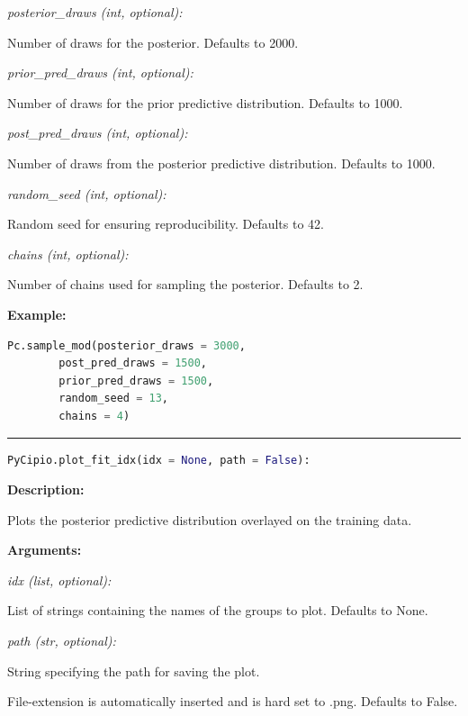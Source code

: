 \documentclass{article}
\begin{document}
\indent \indent \textit{posterior\_draws (int, optional):} 

\indent \indent \indent Number of draws for the posterior. Defaults to 2000.

\indent \indent \textit{prior\_pred\_draws (int, optional):} 

\indent \indent \indent Number of draws for the prior predictive distribution. Defaults to 1000.

\indent \indent \textit{post\_pred\_draws (int, optional):} 

\indent \indent \indent Number of draws from the posterior predictive distribution. Defaults to 1000.

\indent \indent \textit{random\_seed (int, optional):}

\indent \indent \indent Random seed for ensuring reproducibility. Defaults to 42.

\indent \indent \textit{chains (int, optional):} 

\indent \indent \indent Number of chains used for sampling the posterior. Defaults to 2.

\indent \textbf{Example:}

\begin{lstlisting}[language=Python]
        Pc.sample_mod(posterior_draws = 3000, 
        post_pred_draws = 1500, 
        prior_pred_draws = 1500, 
        random_seed = 13, 
        chains = 4)
\end{lstlisting}


\hrule

\begin{lstlisting}[language=Python]
    PyCipio.plot_fit_idx(idx = None, path = False):
\end{lstlisting}

\indent \textbf{Description:} 

\indent \indent Plots the posterior predictive distribution overlayed on the training data.

\indent \textbf{Arguments:}

\indent \indent \textit{idx (list, optional):} 

\indent \indent \indent List of strings containing the names of the groups to plot. Defaults to None.

\indent \indent \textit{path (str, optional):}

\indent \indent \indent String specifying the path for saving the plot. 

\indent \indent \indent File-extension is automatically inserted and is hard set to .png. Defaults to False.
\end{document}
